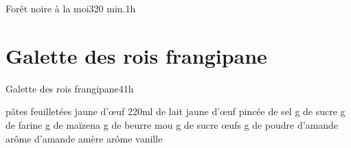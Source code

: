 {\begin{recette}{Forêt noire à la moi}{3}{20 min.}{1h}
\begin{preparation}
\end{preparation}

\begin{cuisson}

\end{cuisson}
\end{recette}

\section{Galette des rois frangipane}
\begin{recette}{Galette des rois frangipane}{4}{}{1h}
\begin{ingredients}
 pâtes feuilletées
 jaune d’œuf
\ingredient 220ml de lait
 jaune d’œuf
 pincée de sel
 g de sucre
 g de farine
 g de maïzena
 g de beurre mou
 g de sucre
 œufs
 g de poudre d’amande
\ingredient arôme d’amande amère
\ingredient arôme vanille
\end{ingredients}


\end{recette}}
